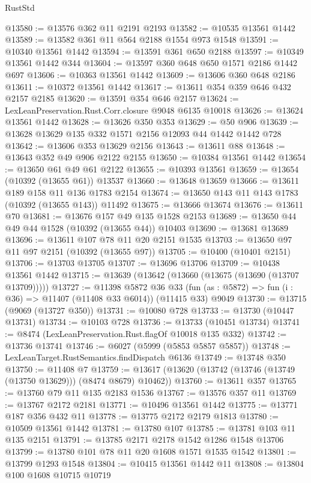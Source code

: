 \begin{lexlean}{RustStd}
\begin{coremodule}
{{@13580 := @13576 @362 @11 @2191 @2193
@13582 := @10535 @13561 @1442
@13589 := @13582 @361 @11 @564 @2188 @1554 @973 @1548
@13591 := @10340 @13561 @1442
@13594 := @13591 @361 @650 @2188
@13597 := @10349 @13561 @1442 @344
@13604 := @13597 @360 @648 @650 @1571 @2186 @1442 @697
@13606 := @10363 @13561 @1442
@13609 := @13606 @360 @648 @2186
@13611 := @10372 @13561 @1442
@13617 := @13611 @354 @359 @646 @432 @2157 @2185
@13620 := @13591 @354 @646 @2157
@13624 := LexLeanPreservation.Rust.Corr.closure @9048 @6135 @10018
@13626 := @13624 @13561 @1442
@13628 := @13626 @350 @353
@13629 := @50 @906
@13639 := @13628 @13629 @135 @332 @1571 @2156 @12093 @44 @1442 @1442 @728
@13642 := @13606 @353 @13629 @2156
@13643 := @13611 @88
@13648 := @13643 @352 @49 @906 @2122 @2155
@13650 := @10384 @13561 @1442
@13654 := @13650 @61 @49 @61 @2122
@13655 := @10393 @13561
@13659 := @13654 (@10392 (@13655 @61)) @13537
@13660 := @13648 @13659
@13666 := @13611 @189 @158 @11 @136 @1783 @2154
@13674 := @13650 @143 @11 @143 @1783 (@10392 (@13655 @143)) @11492
@13675 := @13666 @13674
@13676 := @13611 @70
@13681 := @13676 @157 @49 @135 @1528 @2153
@13689 := @13650 @44 @49 @44 @1528 (@10392 (@13655 @44)) @10403
@13690 := @13681 @13689
@13696 := @13611 @107 @78 @11 @20 @2151 @1535
@13703 := @13650 @97 @11 @97 @2151 (@10392 (@13655 @97))
@13705 := @10400 (@10401 @2151)
@13706 := @13703 @13705
@13707 := @13696 @13706
@13709 := @10438 @13561 @1442
@13715 := @13639 (@13642 (@13660 (@13675 (@13690 (@13707 @13709)))))
@13727 := @11398
    @5872
    @36
    @33
    (fun (as : @5872) => fun (i : @36) => @11407 (@11408 @33 @6014))
    (@11415 @33)
    @9049
@13730 := @13715 (@9069 (@13727 @350))
@13731 := @10080 @728
@13733 := @13730 (@10447 @13731)
@13734 := @10103 @728
@13736 := @13733 (@10451 @13734)
@13741 := @8474 (LexLeanPreservation.Rust.flagOf @10018 @135 @332)
@13742 := @13736 @13741
@13746 := @6027 (@5999 (@5853 @5857 @5857))
@13748 := LexLeanTarget.RustSemantics.findDispatch @6136
@13749 := @13748 @350
@13750 := @11408 @7
@13759 := @13617 (@13620 (@13742 (@13746 (@13749 (@13750 @13629))) (@8474 @8679) @10462))
@13760 := @13611 @357
@13765 := @13760 @79 @11 @135 @2183 @1536
@13767 := @13576 @357 @11
@13769 := @13767 @2172 @2181
@13771 := @10496 @13561 @1442
@13775 := @13771 @187 @356 @432 @11
@13778 := @13775 @2172 @2179 @1813
@13780 := @10509 @13561 @1442
@13781 := @13780 @107
@13785 := @13781 @103 @11 @135 @2151
@13791 := @13785 @2171 @2178 @1542 @1286 @1548 @13706
@13799 := @13780 @101 @78 @11 @20 @1608 @1571 @1535 @1542
@13801 := @13799 @1293 @1548
@13804 := @10415 @13561 @1442 @11
@13808 := @13804 @100 @1608 @10715 @10719
}}
\end{coremodule}
\end{lexlean}
